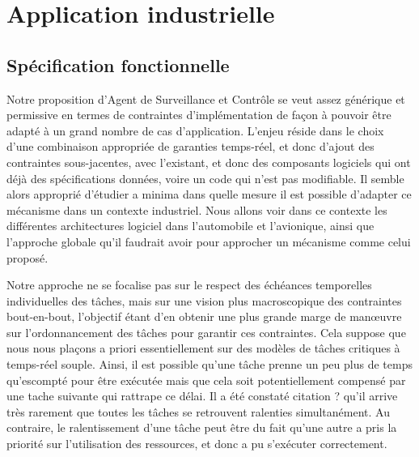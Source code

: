 \documentclass[french, a4paper, 11pt, twoside, pdftex]{StyleThese}
\begin{document}
\section{Application industrielle}
    \subsection{Spécification fonctionnelle}
    	Notre proposition d'Agent de Surveillance et Contrôle se veut assez générique et permissive en termes de contraintes d'implémentation de façon à pouvoir être adapté à un grand nombre de cas d'application. L'enjeu réside dans le choix d'une combinaison appropriée de garanties temps-réel, et donc d'ajout des contraintes sous-jacentes, avec l'existant, et donc des composants logiciels qui ont déjà des spécifications données, voire un code qui n'est pas modifiable. Il semble alors approprié d'étudier a minima dans quelle mesure il est possible d'adapter ce mécanisme dans un contexte industriel. Nous allons voir dans ce contexte les différentes architectures logiciel dans l'automobile et l'avionique, ainsi que l'approche globale qu'il faudrait avoir pour approcher un mécanisme comme celui proposé.
    	
    	Notre approche ne se focalise pas sur le respect des échéances temporelles individuelles des tâches, mais sur une vision plus macroscopique des contraintes bout-en-bout, l'objectif étant d'en obtenir une plus grande marge de manœuvre sur l'ordonnancement des tâches pour garantir ces contraintes. Cela suppose que nous nous plaçons a priori essentiellement sur des modèles de tâches critiques à temps-réel souple. Ainsi, il est possible qu'une tâche prenne un peu plus de temps qu'escompté pour être exécutée mais que cela soit potentiellement compensé par une tache suivante qui rattrape ce délai. Il a été constaté \alert{citation ?} qu'il arrive très rarement que toutes les tâches se retrouvent ralenties simultanément. Au contraire, le ralentissement d'une tâche peut être du fait qu'une autre a pris la priorité sur l'utilisation des ressources, et donc a pu s'exécuter correctement. 
    	
\end{document}

